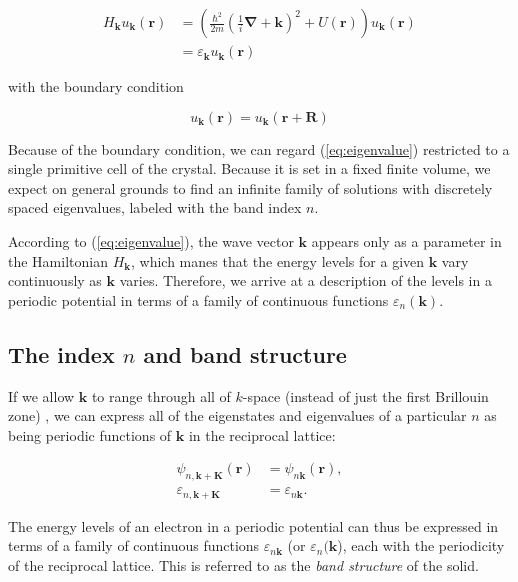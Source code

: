 		\begin{align} \label{eq:eigenvalue}
			H_{\mathbf{k}} u_{\mathbf{k}} (\mathbf{r})
			&= \left( \frac{\hbar^2}{2m}
			\left(\frac{1}{i} \boldsymbol{\nabla}
			+ \mathbf{k} \right)^2
			+ U(\mathbf{r}) \right)
			u_\mathbf{k} (\mathbf{r}) \\
			&= \varepsilon_{\mathbf{k}} 
			u_\mathbf{k}(\mathbf{r})
		\end{align}

		with the boundary condition

		\begin{equation*}
			u_\mathbf{k} (\mathbf{r})
			= u_\mathbf{k} (\mathbf{r} + \mathbf{R})
		\end{equation*}

		Because of the boundary condition, we can regard (\ref{eq:eigenvalue}) restricted to a single primitive cell of the crystal. Because it is set in a fixed finite volume, we expect on general grounds to find an infinite family of solutions with discretely spaced eigenvalues, labeled with the band index $n$.

		According to (\ref{eq:eigenvalue}), the wave vector $\mathbf{k}$ appears only as a parameter in the Hamiltonian $H_{\mathbf{k}}$, which manes that the energy levels for a given $\mathbf{k}$ vary continuously as $\mathbf{k}$ varies. Therefore, we arrive at a description of the levels in a periodic potential in terms of a family of continuous functions $\varepsilon_{n} (\mathbf{k})$. 

	\subsection{The index $n$ and band structure}
		If we allow $\mathbf{k}$ to range through all of $k$-space (instead of just the first Brillouin zone) , we can express all of the eigenstates and eigenvalues of a particular $n$ as being periodic functions of $\mathbf{k}$ in the reciprocal lattice:

		\begin{align} \label{eq:eigen_k_K}
			\psi_{n,\mathbf{k+K}} (\mathbf{r})
			&= \psi_{n\mathbf{k}} (\mathbf{r}), \\ \nonumber
			\varepsilon_{n, \mathbf{k+K}}
			&= \varepsilon_{n\mathbf{k}}.
		\end{align}


		The energy levels of an electron in a periodic potential can thus be expressed in terms of a family of continuous functions $\varepsilon_{n\mathbf{k}}$ (or $\varepsilon_{n}(\mathbf{k}$), each with the periodicity of the reciprocal lattice. This is referred to as the \emph{band structure} of the solid. 
		


















